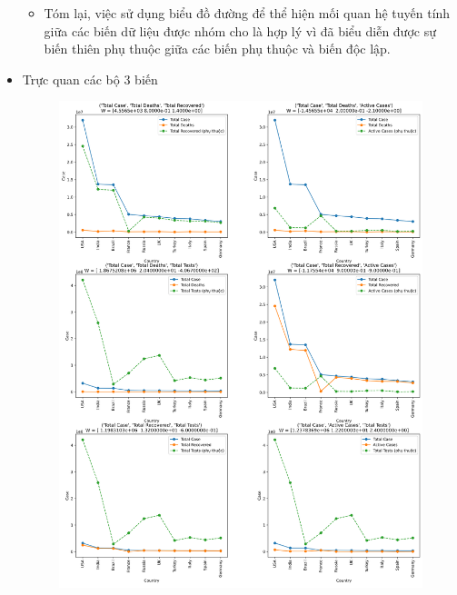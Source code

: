 \documentclass[a4paper, 12pt]{article}
\begin{document}
\begin{itemize}
\begin{itemize}
            \item Tóm lại, việc sử dụng biểu đồ đường để thể hiện mối quan hệ tuyến tính giữa các biến dữ liệu được nhóm cho là hợp lý vì đã biểu diễn được sự biến thiên phụ thuộc giữa các biến phụ thuộc và biến độc lập.
        \end{itemize}

        \item Trực quan các bộ 3 biến
        \begin{figure}[H]
            \begin{center}
                \includegraphics[scale=0.39]{img/relationship3Vars.png}
            \end{center}
        \end{figure}
        \begin{figure}[H]
            \begin{center}

\end{center}
\end{figure}
\end{itemize}
\end{document}
